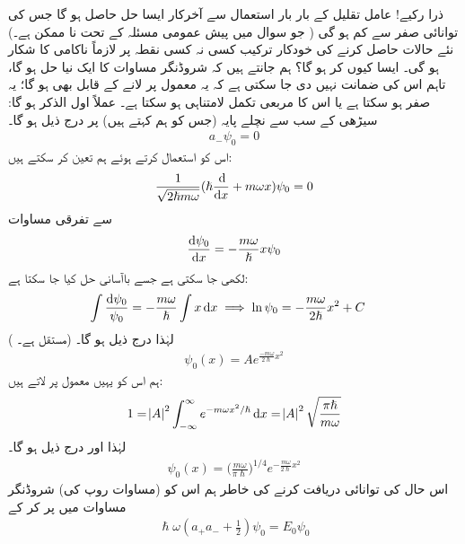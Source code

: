 ذرا رکیے! عامل تقلیل کے بار بار استعمال سے آخرکار  ایسا حل حاصل ہو گا جس کی توانائی صفر سے کم ہو گی ( جو سوال  میں پیش عمومی مسئلہ کے تحت  نا ممکن ہے۔)  نئے حالات  حاصل کرنے کی خودکار ترکیب  کسی نہ کسی نقطہ پر  لازماً ناکامی کا شکار ہو گی۔  ایسا کیوں کر ہو گا؟ ہم جانتے ہیں کہ    شروڈنگر   مساوات کا ایک نیا حل ہو گا، تاہم اس کی ضمانت نہیں دی جا  سکتی  ہے کہ یہ معمول پر لانے کے قابل بھی ہو گا؛  یہ صفر ہو سکتا ہے  یا اس کا مربعی تکمل لامتناہی ہو سکتا ہے۔ عملاً اول الذکر ہو گا: سیڑھی کے سب سے نچلے پایہ (جس کو ہم   کہتے ہیں) پر درج ذیل ہو گا۔  
\begin{align}
 a_- \psi_0 = 0 
\end{align}  
اس کو استعمال کرتے ہوئے ہم  تعین کر سکتے ہیں:
\begin{align*}
\frac{1}{\sqrt{2 \hslash m \omega}} ( \hslash \frac{\dif }{\dif x} + m \omega x ) \psi_0 = 0 
\end{align*}
سے تفرقی مساوات
\begin{align*}
\frac{ \dif  \psi_0}{\dif x } = -\frac{m \omega }{ \hslash } x \psi_0
\end{align*}
لکھی جا سکتی ہے جسے باآسانی حل کیا جا سکتا ہے: 
\begin{align*}
\int{\frac{ \dif \psi_0 }{ \psi_0 } } &= -\frac{ m \omega }{ \hslash } \int{ x \dif x } \implies \ln \psi_0 = 
-\frac{m \omega }{ 2 \hslash } x^2 +C  
\end{align*} 
( مستقل ہے۔) لہٰذا درج ذیل ہو گا۔
\begin{align*}
\psi_0 (x) = A e^{\frac{ - m \omega }{ 2 \hslash } x^2}
\end{align*}
ہم اس کو یہیں معمول پر لاتے ہیں: 
\begin{align*}
1 = \abs{A}^2 \int_{ - \infty}^{ \infty } e^{- m \omega x^2/ \hslash}  \dif x = \abs{A}^2  \sqrt{ \frac{ \pi \hslash }{ m \omega }}
\end{align*}
لہٰذا  اور درج ذیل ہو گا۔
\\
\begin{align}\label{مساوات_شروڈنگر_معمول_شدہ_حال_صفر}
\psi_0 (x) = \big(\frac{ m \omega }{ \pi  \hslash}\big)^{1/4} e^{-\frac{ m \omega }{ 2 \hslash} x^2}
\end{align}
اس حال کی توانائی دریافت کرنے کی خاطر ہم اس کو (مساوات  روپ کی) شروڈنگر  مساوات میں پر کر کے
\begin{align*}
\hslash \omega (a_+ a_- + \tfrac{1}{2} )\psi_0 = E_0 \psi_0 
\end{align*}

